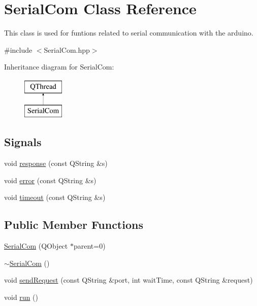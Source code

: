 \hypertarget{class_serial_com}{\section{Serial\-Com Class Reference}
\label{class_serial_com}
}


This class is used for funtions related to serial communication with the arduino.  




{\ttfamily \#include $<$Serial\-Com.\-hpp$>$}

Inheritance diagram for Serial\-Com\-:\begin{figure}[H]
\begin{center}
\leavevmode
\includegraphics[height=2.000000cm]{class_serial_com}
\end{center}
\end{figure}
\subsection*{Signals}
\begin{DoxyCompactItemize}
\item 
void \hyperlink{class_serial_com_a9e83e2b67a01ee9504719c4b11375635}{response} (const Q\-String \&s)
\item 
void \hyperlink{class_serial_com_a453c5249e7e171dcc3a32b722ccaec23}{error} (const Q\-String \&s)
\item 
void \hyperlink{class_serial_com_acac1f4d821122f430e06ad13b964974f}{timeout} (const Q\-String \&s)
\end{DoxyCompactItemize}
\subsection*{Public Member Functions}
\begin{DoxyCompactItemize}
\item 
\hyperlink{class_serial_com_ae84f828a2adf56b4a20365a4de438ab4}{Serial\-Com} (Q\-Object $\ast$parent=0)
\item 
\hyperlink{class_serial_com_a5582cf804e661a24cb32720b31a2f9fe}{$\sim$\-Serial\-Com} ()
\item 
void \hyperlink{class_serial_com_aeefa54d2e7de44116e9ee6178020607e}{send\-Request} (const Q\-String \&port, int wait\-Time, const Q\-String \&request)
\item 
void \hyperlink{class_serial_com_a842c52f3e42ee3cc4b7c1ebaff83c560}{run} ()
\end{DoxyCompactItemize}


